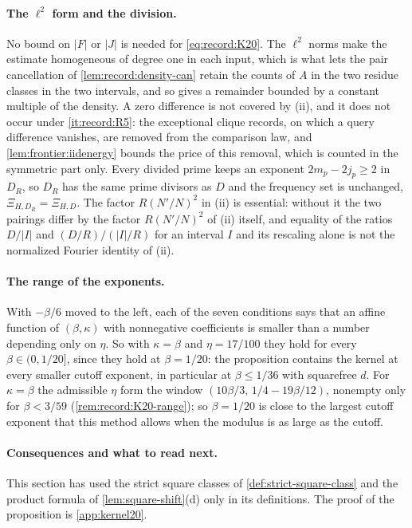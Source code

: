 \paragraph{The $\ell^2$ form and the division.}
No bound on $|F|$ or $|J|$ is needed for \eqref{eq:record:K20}. The $\ell^2$
norms make the estimate homogeneous of degree one in each input, which is what
lets the pair cancellation of \cref{lem:record:density-can} retain the
counts of $A$ in the two residue classes in the two intervals, and so gives
a remainder bounded by a constant multiple of the density. A zero
difference is not covered by (ii), and it does not occur under
\ref{it:record:R5}: the exceptional clique records, on which a query difference
vanishes, are removed from the comparison law, and \cref{lem:frontier:iidenergy}
bounds the price of this removal, which is counted in the symmetric part only. Every divided prime keeps an exponent
$2m_p-2j_p\ge2$ in $D_R$, so $D_R$ has the same prime divisors as $D$ and the
frequency set is unchanged, $\Xi_{H,D_R}=\Xi_{H,D}$. The factor $R(N'/N)^2$ in
(ii) is essential: without it the two pairings differ by the factor
$R(N'/N)^2$ of (ii) itself, and equality of the ratios $D/|I|$ and
$(D/R)/(|I|/R)$ for an interval $I$ and its rescaling alone is not the
normalized Fourier identity of (ii).

\paragraph{The range of the exponents.}
With $-\beta/6$ moved to the left, each of the seven conditions says that an
affine function of $(\beta,\kappa)$ with nonnegative coefficients is smaller
than a number depending only on $\eta$. So with $\kappa=\beta$ and
$\eta=17/100$ they hold for every $\beta\in(0,1/20]$, since they hold at
$\beta=1/20$: the proposition contains the kernel at every smaller cutoff
exponent, in particular at $\beta\le1/36$ with squarefree $d$. For
$\kappa=\beta$ the admissible $\eta$ form the window
$(10\beta/3,\,1/4-19\beta/12)$, nonempty only for $\beta<3/59$
(\cref{rem:record:K20-range}); so $\beta=1/20$ is close to the largest cutoff
exponent that this method allows when the modulus is as large as the cutoff.

\paragraph{Consequences and what to read next.}
This section has used the strict square classes of
\cref{def:strict-square-class} and the product formula of
\cref{lem:square-shift}(d) only in its definitions. The proof of
the proposition is \cref{app:kernel20}.
